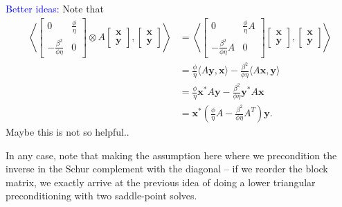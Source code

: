 \documentclass[a4paper,10pt]{article}
\newcommand{\tcb}{\textcolor{blue}}
\begin{document}
\tcb{Better ideas:} Note that
%
\begin{align*}
\left\langle \begin{bmatrix} 0 & \frac{\phi}{\eta} \\ -\frac{\beta^2}{\phi\eta} & 0 \end{bmatrix}
	\otimes A \begin{bmatrix} \mathbf{x}\\\mathbf{y} \end{bmatrix},
	\begin{bmatrix} \mathbf{x}\\\mathbf{y} \end{bmatrix}\right\rangle 
& = \left\langle \begin{bmatrix} 0 & \frac{\phi}{\eta} A \\ -\frac{\beta^2}{\phi\eta}A & 0 \end{bmatrix}
	\begin{bmatrix} \mathbf{x}\\\mathbf{y} \end{bmatrix},
	\begin{bmatrix} \mathbf{x}\\\mathbf{y} \end{bmatrix}\right\rangle \\
& = \frac{\phi}{\eta} \langle A\mathbf{y},\mathbf{x}\rangle -
	\frac{\beta^2}{\phi\eta}\langle A\mathbf{x},\mathbf{y}\rangle \\
& = \frac{\phi}{\eta}\mathbf{x}^*A\mathbf{y} - \frac{\beta^2}{\phi\eta}\mathbf{y}^*A\mathbf{x} \\
& = \mathbf{x}^*\left(\frac{\phi}{\eta}A - \frac{\beta^2}{\phi\eta}A^T \right)\mathbf{y}.
\end{align*}
%
Maybe this is not so helpful..

In any case, note that making the assumption here where we precondition the inverse
in the Schur complement with the diagonal -- if we reorder the block matrix, we
exactly arrive at the previous idea of doing a lower triangular preconditioning
with two saddle-point solves.
\end{document}
